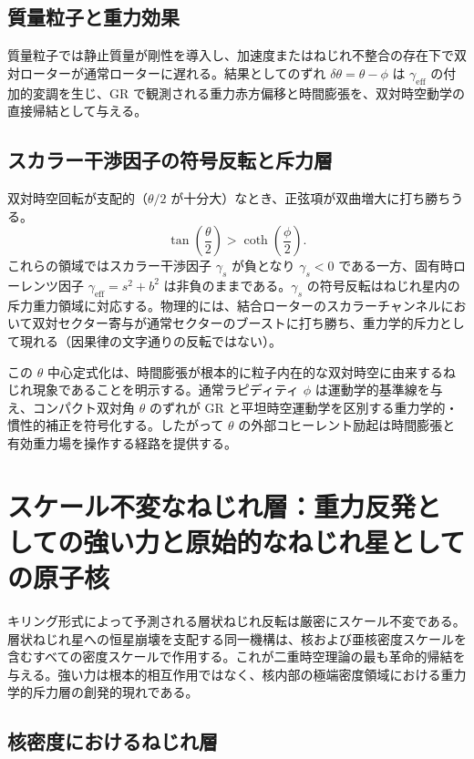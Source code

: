 \documentclass[a4paper]{article}
\begin{document}
\subsection{質量粒子と重力効果}

質量粒子では静止質量が剛性を導入し、加速度またはねじれ不整合の存在下で双対ローターが通常ローターに遅れる。結果としてのずれ $\delta\theta = \theta - \phi$ は $\gamma_{\text{eff}}$ の付加的変調を生じ、GR で観測される重力赤方偏移と時間膨張を、双対時空動学の直接帰結として与える。

\subsection{スカラー干渉因子の符号反転と斥力層}

双対時空回転が支配的（$\theta/2$ が十分大）なとき、正弦項が双曲増大に打ち勝ちうる。
\[
\tan\left(\frac{\theta}{2}\right) > \coth\left(\frac{\phi}{2}\right).
\]
これらの領域ではスカラー干渉因子 $\gamma_s$ が負となり $\gamma_s < 0$ である一方、固有時ローレンツ因子 $\gamma_\text{eff} = s^2 + b^2$ は非負のままである。$\gamma_s$ の符号反転はねじれ星内の斥力重力領域に対応する。物理的には、結合ローターのスカラーチャンネルにおいて双対セクター寄与が通常セクターのブーストに打ち勝ち、重力学的斥力として現れる（因果律の文字通りの反転ではない）。

この $\theta$ 中心定式化は、時間膨張が根本的に粒子内在的な双対時空に由来するねじれ現象であることを明示する。通常ラピディティ $\phi$ は運動学的基準線を与え、コンパクト双対角 $\theta$ のずれが GR と平坦時空運動学を区別する重力学的・慣性的補正を符号化する。したがって $\theta$ の外部コヒーレント励起は時間膨張と有効重力場を操作する経路を提供する。

\section{スケール不変なねじれ層：重力反発としての強い力と原始的なねじれ星としての原子核}
\label{sec:nuclear}

キリング形式によって予測される層状ねじれ反転は厳密にスケール不変である。層状ねじれ星への恒星崩壊を支配する同一機構は、核および亜核密度スケールを含むすべての密度スケールで作用する。これが二重時空理論の最も革命的帰結を与える。強い力は根本的相互作用ではなく、核内部の極端密度領域における重力学的斥力層の創発的現れである。

\subsection{核密度におけるねじれ層}
\end{document}
